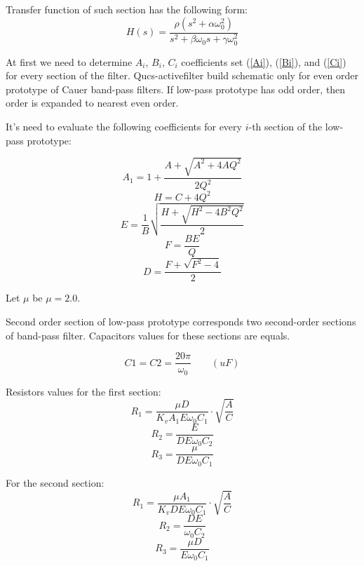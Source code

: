 Transfer function of such section has the following form:
\begin{equation}
 H(s) = \frac{\rho(s^2+\alpha\omega_0^2)}{s^2+\beta\omega_0s+\gamma\omega_0^2}
\end{equation}


At first we need to determine $A_i$, $B_i$, $C_i$ coefficients set (\ref{Ai}), 
(\ref{Bi}), and (\ref{Ci}) for every section of the filter. Qucs-activefilter 
build schematic only for even order prototype of Cauer band-pass filters. If 
low-pass prototype has odd order, then order is expanded to nearest even order.

It's need to evaluate the following coefficients for every $i$-th section of 
the low-pass prototype:

\begin{equation}
 A_1 = 1+\frac{A+\sqrt{A^2+4AQ^2}}{2Q^2}
\end{equation}
\begin{equation}
 H=C+4Q^2
\end{equation}
\begin{equation}
 E=\frac{1}{B}\sqrt{\frac{H+\sqrt{H^2-4B^2Q^2}}{2}}
\end{equation}
\begin{equation}
 F=\frac{BE}{Q}
\end{equation}
\begin{equation}
 D=\frac{F+\sqrt{F^2-4}}{2}
\end{equation}

Let $\mu$ be $\mu=2.0$.

Second order section of low-pass prototype corresponds two second-order 
sections of band-pass filter. Capacitors values for these sections are equals. 

\begin{equation}
 C1 = C2 = \frac{20\pi}{\omega_0} \qquad (uF) \label{eq:C1_C2_bpf}
\end{equation}

Resistors values for the first section:
\begin{equation}
 R_1= \frac{\mu D}{K_v A_1 E \omega_0 C_1}\cdot\sqrt{\frac{A}{C}}
\end{equation}
\begin{equation}
 R_2=\frac{E}{DE\omega_0 C_2}
\end{equation}
\begin{equation}
 R_3=\frac{\mu}{DE\omega_0 C_1}
\end{equation}

For the second section:
\begin{equation}
 R_1= \frac{\mu A_1}{K_v D E \omega_0 C_1}\cdot\sqrt{\frac{A}{C}}
\end{equation}
\begin{equation}
 R_2=\frac{DE}{\omega_0 C_2}
\end{equation}
\begin{equation}
 R_3=\frac{\mu D}{E\omega_0 C_1}
\end{equation}

